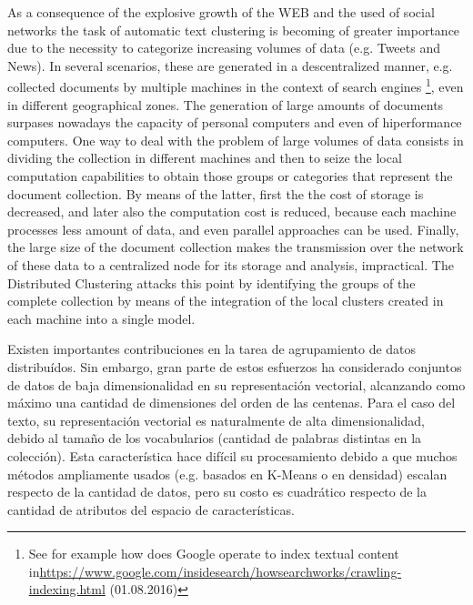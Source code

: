 \documentclass[10pt]{article}
\begin{document}
As a consequence of the explosive growth of the WEB and the used of social networks the task of automatic text clustering is becoming of greater importance due to the necessity to categorize increasing volumes of data (e.g. Tweets and News). In several scenarios, these are generated in a descentralized manner, e.g. collected documents by multiple machines in the context of search engines \footnote{See for example how does Google operate to index textual content in\url{https://www.google.com/insidesearch/howsearchworks/crawling-indexing.html} (01.08.2016)}, even in different geographical zones. The generation of large amounts of documents surpases nowadays the capacity of personal computers and even of hiperformance computers. One way to deal with the problem of large volumes of data consists in dividing the collection in different machines and then to seize the local computation capabilities to obtain those groups or categories that represent the document collection. By means of the latter, first the the cost of storage is decreased, and later also the computation cost is reduced, because each machine processes less amount of data, and even parallel approaches can be used. Finally, the large size of the document collection makes the transmission over the network of these data  to a centralized node for its storage and analysis, impractical. The Distributed Clustering attacks this point by identifying the groups of the complete collection by means of the integration of the local clusters created in each machine into a single model.

Existen importantes contribuciones en la tarea de agrupamiento de datos distribuídos. Sin embargo, gran parte de estos esfuerzos ha considerado conjuntos de datos de baja dimensionalidad en su representación vectorial, alcanzando como máximo una cantidad de dimensiones del orden de las centenas. Para el caso del texto, su representación vectorial es naturalmente de alta dimensionalidad, debido al tamaño de los vocabularios (cantidad de palabras distintas en la colección). Esta característica hace difícil su procesamiento debido a que muchos métodos ampliamente usados (e.g. basados en K-Means o en densidad) escalan respecto de la cantidad de datos, pero su costo es cuadrático respecto de la cantidad de atributos del espacio de características.
\end{document}
